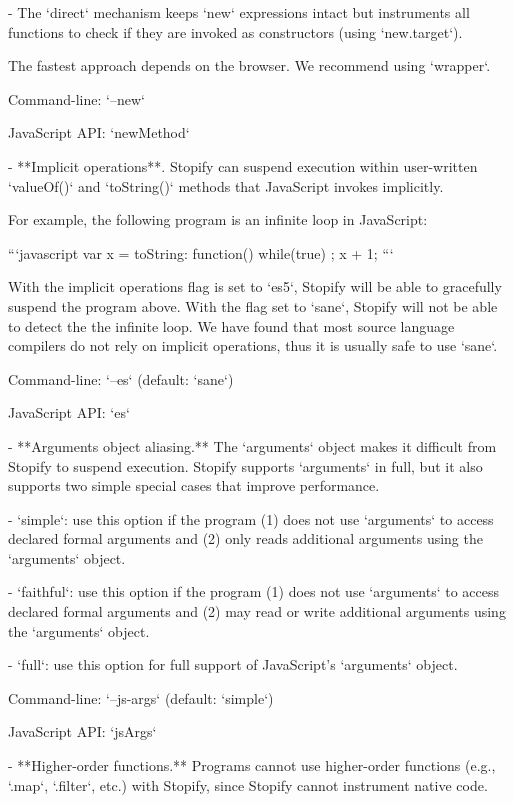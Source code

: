\documentclass{book}
\begin{document}
   - The `direct` mechanism keeps `new` expressions intact but instruments
     all functions to check if they are invoked as constructors 
     (using `new.target`).

  The fastest approach depends on the browser. We recommend using `wrapper`.

  Command-line: `--new`

  JavaScript API: `newMethod`

- **Implicit operations**. Stopify can suspend execution
  within user-written `valueOf()` and `toString()` methods
  that JavaScript invokes implicitly.

  For example, the following program is an infinite loop
  in JavaScript:

  ```javascript
  var x = { toString: function() { while(true) { } } };
  x + 1;
  ```

  With the implicit operations flag is set to `es5`,
  Stopify will  be able to gracefully suspend the program
  above. With the flag set to `sane`, Stopify will not be able to detect the
  the infinite loop. We have found that most source language compilers do not
  rely on implicit operations, thus it is usually safe to use `sane`.

  Command-line: `--es` (default: `sane`)

  JavaScript API: `es`

- **Arguments object aliasing.** The `arguments` object makes it difficult
  from Stopify to suspend execution. Stopify supports `arguments` in full, but
  it also supports two simple special cases that improve performance.

  - `simple`: use this option if the program (1) does not use `arguments` to
    access declared formal arguments and (2) only reads additional
    arguments using the `arguments` object.

  - `faithful`: use this option if the program (1) does not use `arguments`
    to access declared formal arguments and (2) may read or write additional
    arguments using the `arguments` object.

  - `full`: use this option for full support of JavaScript's `arguments` object.

  Command-line: `--js-args` (default: `simple`)

  JavaScript API: `jsArgs`

- **Higher-order functions.** Programs cannot use higher-order functions
  (e.g., `.map`, `.filter`, etc.) with Stopify, since Stopify cannot
  instrument native code.
\end{document}
